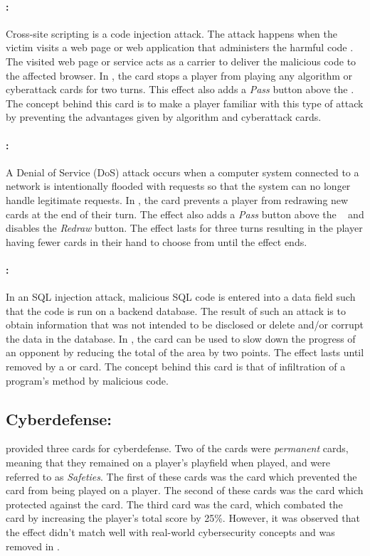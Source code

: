 \paragraph{\CSSns:}
Cross-site scripting is a code injection attack. The attack happens when the victim visits a web page or web application that administers the harmful code \cite{Crosssite}. The visited web page or service acts as a carrier to deliver the malicious code to the affected browser. In \pwTwoNS, the \CSS card stops a player from playing any algorithm or cyberattack cards for two turns. This effect also adds a \emph{Pass} button above the \Hand. The concept behind this card is to make a player familiar with this type of attack by preventing the advantages given by algorithm and cyberattack cards.

\paragraph{\DoSns:}
A Denial of Service (DoS) attack occurs when a computer system connected to a network is intentionally flooded with requests so that the system can no longer handle legitimate requests. In \pwTwoNS, the \DoS card prevents a player from redrawing new cards at the end of their turn. The effect also adds a \emph{Pass} button above the \Hand~ and disables the \emph{Redraw} button. The effect lasts for three turns resulting in the player having fewer cards in their hand to choose from until the effect ends.

\paragraph{\SQLns:}
In an SQL injection attack, malicious SQL code is entered into a data field such that the code is run on a backend database. The result of such an attack is to obtain information that was not intended to be disclosed or delete and/or corrupt the data in the database. In \pwTwoNS, the \SQL card can be used to slow down the progress of an opponent by reducing the total of the \MS area by two points. The effect lasts until removed by a \Fire or \Scan card. The concept behind this card is that of infiltration of a program's method by malicious code. 

\subsection{Cyberdefense:}
\pwOne provided three cards for cyberdefense. Two of the cards were \emph{permanent} cards, meaning that they remained on a player's playfield when played, and were referred to as \emph{Safeties}. The first of these cards was the \Anti card which prevented the \Mal card from being played on a player. The second of these cards was the \Fire card which protected against the \Hack card. The third card was the \Over card, which combated the \Mal card by increasing the player's total score by 25\%. However, it was observed that the \Over effect didn't match well with real-world cybersecurity concepts and was removed in \pwTwoNS.  

